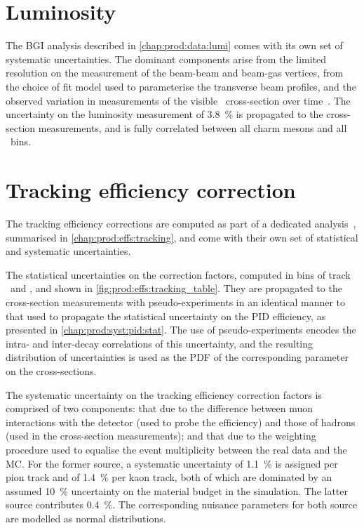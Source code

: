 \section{Luminosity}
\label{chap:prod:syst:lumi}

The \acl{BGI} analysis described in \cref{chap:prod:data:lumi} comes with its 
own set of systematic uncertainties.
The dominant components arise from the limited resolution on the measurement of 
the beam-beam and beam-gas vertices, from the choice of fit model used to 
parameterise the transverse beam profiles, and the observed variation in 
measurements of the visible \pp\ cross-section over 
time~\cite{LHCb-PAPER-2014-047}.
The uncertainty on the luminosity measurement of \SI{3.8}{\%} is propagated to 
the cross-section measurements, and is fully correlated between all charm 
mesons and all \pTy\ bins.

\section{Tracking efficiency correction}
\label{chap:prod:syst:tracking}

The tracking efficiency corrections are computed as part of a dedicated 
analysis~\cite{Aaij:2014pwa}, summarised in \cref{chap:prod:effs:tracking}, and 
come with their own set of statistical and systematic uncertainties.

The statistical uncertainties on the correction factors, computed in bins of 
track \ptot\ and \Eta, and shown in \cref{fig:prod:effs:tracking_table}.
They are propagated to the cross-section measurements with pseudo-experiments 
in an identical manner to that used to propagate the statistical uncertainty on 
the \ac{PID} efficiency, as presented in \cref{chap:prod:syst:pid:stat}.
The use of pseudo-experiments encodes the intra- and inter-decay correlations 
of this uncertainty, and the resulting distribution of uncertainties is used as 
the \ac{PDF} of the corresponding parameter on the cross-sections.

The systematic uncertainty on the tracking efficiency correction factors is 
comprised of two components: that due to the difference between muon 
interactions with the detector (used to probe the efficiency) and those of 
hadrons (used in the cross-section measurements); and that due to the weighting 
procedure used to equalise the event multiplicity between the real data and the 
\ac{MC}.
For the former source, a systematic uncertainty of \SI{1.1}{\percent} is 
assigned per pion track and of \SI{1.4}{\percent} per kaon track, both of which 
are dominated by an assumed \SI{10}{\percent} uncertainty on the material 
budget in the simulation.
The latter source contributes \SI{0.4}{\percent}.
The corresponding nuisance parameters for both source are modelled as normal 
distributions.

